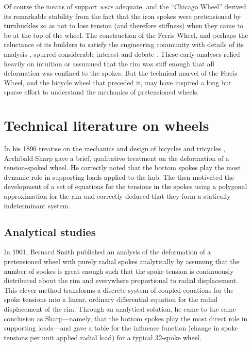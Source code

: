\documentclass[../thesis.tex]{subfiles}
\begin{document}
Of course the means of support \emph{were} adequate, and the ``Chicago Wheel'' derived its remarkable stability from the fact that the iron spokes were pretensioned by turnbuckles so as not to lose tension (and therefore stiffness) when they came to be at the top of the wheel. The construction of the Ferris Wheel, and perhaps the reluctance of its builders to satisfy the engineering community with details of its analysis , spurred considerable interest and debate \cite{Searles1893}. These early analyses relied heavily on intuition or assumued that the rim was stiff enough that all deformation was confined to the spokes. But the technical marvel of the Ferris Wheel, and the bicycle wheel that preceded it, may have inspired a long but sparse effort to understand the mechanics of pretensioned wheels.


\section{Technical literature on wheels}


In his 1896 treatise on the mechanics and design of bicycles and tricycles \cite{Sharp1977}, Archibald Sharp gave a brief, qualitative treatment on the deformation of a tension-spoked wheel. He correctly noted that the bottom spokes play the most dynamic role in supporting loads applied to the hub. The then motivated the development of a set of equations for the tensions in the spokes using a polygonal approximation for the rim and correctly deduced that they form a statically indeterminant system.

\subsection{Analytical studies}

In 1901, Bernard Smith \cite{Smith1901} published an analysis of the deformation of a pretensioned wheel with purely radial spokes analytically by assuming that the number of spokes is great enough such that the spoke tension is continuously distributed about the rim and everywhere proportional to radial displacement. This clever method transforms a discrete system of coupled equations for the spoke tensions into a linear, ordinary differential equation for the radial displacement of the rim. Through an analytical solution, he came to the same conclusion as Sharp---namely, that the bottom spokes play the most direct role in supporting loads---and gave a table for the influence function (change in spoke tensions per unit applied radial load) for a typical 32-spoke wheel.
\end{document}
